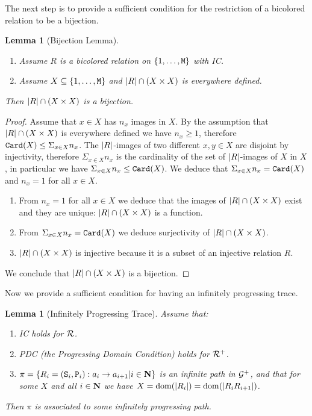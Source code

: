 \documentclass{lmcs}
\newtheorem{lemma}[theorem]{Lemma}
\begin{document}
The next step is to provide a sufficient condition for the restriction of a bicolored relation
to be a bijection.

\begin{lemma}[Bijection Lemma]
\label{lemma-bijection}
\begin{enumerate}
\item
Assume $R$ is a bicolored relation on $\{1, \ldots, {\tt M}\}$
with IC.  
\item
Assume $X \subseteq \{1, \ldots, {\tt M}\}$
and ${| R |} \cap (X \times X)$ is everywhere defined.
\end{enumerate}
Then ${| R |} \cap (X \times X)$ is a bijection. 
\end{lemma}

\begin{proof}
Assume that $x \in X$ has $n_x$ images in $X$. By the assumption that ${| R |} \cap (X \times X)$ is everywhere defined we have $n_x \ge 1$, therefore 
${\tt Card}(X) \le \Sigma_{x \in X} n_x$. 
The ${| R |}$-images of two different $x,y \in X$ are disjoint by injectivity, therefore $ \Sigma_{x \in X} n_x$ is the cardinality of the set of ${| R |}$-images of $X$ in $X$, in particular we have $\Sigma_{x \in X} n_x \le {\tt Card}(X)$. 
We deduce that $\Sigma_{x \in X} n_x = {\tt Card}(X)$ and $n_x=1$ for all $x \in X$. 
\begin{enumerate}
\item
From  $n_x=1$ for all $x \in X$ we deduce that the images of ${| R |} \cap (X \times X)$ exist and they are unique: ${| R |} \cap (X \times X)$ is a function.
\item
From $\Sigma_{x \in X} n_x = {\tt Card}(X)$ we deduce surjectivity of ${| R |} \cap (X \times X)$.
\item
${| R |} \cap (X \times X)$ is injective because it is a subset of an injective relation $R$.
\end{enumerate}
We conclude that ${| R |} \cap (X \times X)$ is a bijection.
\end{proof}

Now we provide a sufficient condition for having an infinitely progressing trace.

\begin{lemma}[Infinitely Progressing Trace]
\label{lemma-infinitely-progressing}
 Assume that:
\begin{enumerate}
\item
IC holds for ${\mathcal R}$. 
\item 
PDC (the Progressing Domain Condition) holds for ${\mathcal R}^+$. 
\item
$\pi = \{R_i = ({\tt S}_i,{\tt P}_i) : a_i \rightarrow a_{i+1} | i \in {\bf N} \}$ is an infinite path in ${\mathcal G}^+$, and that for some $X$ and all $i \in {\bf N}$ we have $X = {\rm dom}({| R_i |}) = {\rm dom}({| R_i R_{i+1} |})$.
\end{enumerate}
Then $\pi$ is associated to some infinitely progressing path.
\end{lemma}
\end{document}
